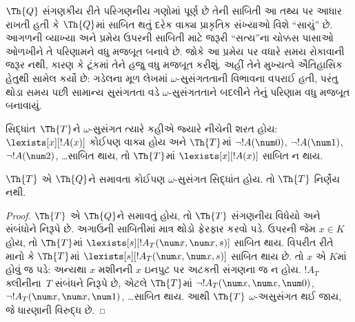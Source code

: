 \documentclass[../../../include/open-logic-section]{subfiles}
\begin{document}


\begin{explain}
$\Th{Q}$ સંગણકીય રીતે
પરિગણનીય ગણોમાં પૂર્ણ છે
તેની સાબિતી આ તથ્ય પર
આધાર રાખતી હતી કે
$\Th{Q}$માં સાબિત થતું
દરેક વાક્ય પ્રાકૃતિક
સંખ્યાઓ વિશે ``સાચું'' છે.
આગળની વ્યાખ્યા અને પ્રમેય
ઉપરની સાબિતી માટે જરૂરી
``સત્ય''ના ચોક્કસ પાસાઓ
ઓળખીને તે પરિણામને વધુ
મજબૂત બનાવે છે. જોકે આ
પ્રમેય પર વધારે સમય રોકાવાની
જરૂર નથી, કારણ કે ટૂંકમાં
તેને હજુ વધુ મજબૂત કરીશું.
અહીં તેને મુખ્યત્વે ઐતિહાસિક
હેતુથી સામેલ કર્યો છે:
ગડેલના મૂળ લેખમાં
$\omega$-સુસંગતતાની
વિભાવના વપરાઈ હતી, પરંતુ
થોડા સમય પછી સામાન્ય
સુસંગતતા વડે
$\omega$-સુસંગતતાને
બદલીને તેનું પરિણામ વધુ
મજબૂત બનાવાયું.
\end{explain}

\begin{defn}
સિદ્ધાંત~$\Th{T}$ને
$\omega$-સુસંગત ત્યારે
કહીએ જ્યારે નીચેની શરત હોય:
$\lexists[x][!A(x)]$ કોઈપણ
વાક્ય હોય અને $\Th{T}$માં
$\lnot !A(\num 0)$,
$\lnot !A(\num 1)$,
$\lnot !A(\num 2)$,
\dots સાબિત થાય, તો
$\Th{T}$માં
$\lexists[x][!A(x)]$
સાબિત ન થાય.
\end{defn}

\begin{thm}
  $\Th{T}$ એ $\Th{Q}$ને
  સમાવતા કોઈપણ
  $\omega$-સુસંગત સિદ્ધાંત
  હોય. તો $\Th{T}$
  નિર્ણેય નથી.
\end{thm}

\begin{proof}
$\Th{T}$ એ $\Th{Q}$ને
સમાવતું હોય, તો
$\Th{T}$ સંગણનીય વિધેયો
અને સંબંધોને નિરૂપે છે.
અગાઉની સાબિતીમાં માત્ર
થોડો ફેરફાર કરવો પડે.
ઉપરની જેમ $x \in K$ હોય,
તો $\Th{T}$માં
$\lexists[s][!A_T(\num
  x,\num x, s)]$ સાબિત થાય.
વિપરીત રીતે માનો કે
$\Th{T}$માં
$\lexists[s][!A_T(\num x, \num x, s)]$
સાબિત થાય છે. તો $x$ એ
$K$માં હોવું જ પડે: અન્યથા
$x$ મશીનની $x$ ઇનપુટ
પર અટકતી સંગણના જ ન હોય.
$!A_T$ ક્લીનીના~$T$
સંબંધને નિરૂપે છે, એટલે
$\Th{T}$માં
$\lnot !A_T(\num x, \num x, \num 0)$,
$\lnot !A_T(\num x, \num
x, \num 1)$, \dots સાબિત
થાય. આથી $\Th{T}$
$\omega$-અસુસંગત થઈ જાય,
જે ધારણાની વિરુદ્ધ છે.
\end{proof}
\end{document}

